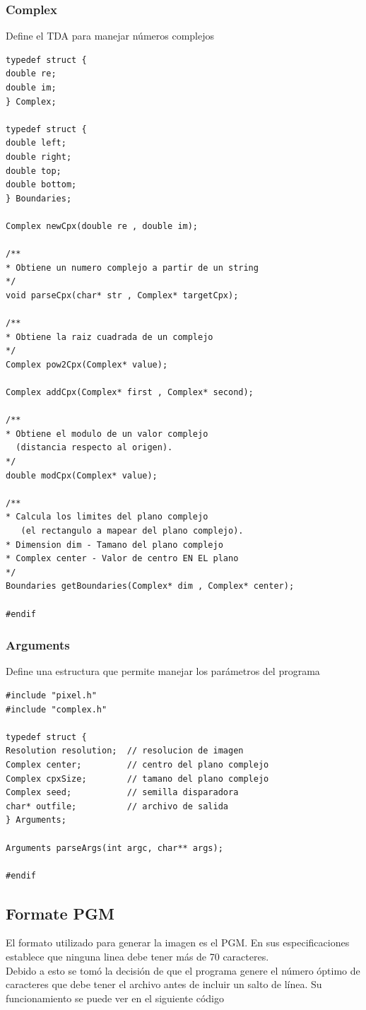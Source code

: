 \documentclass [12pt, a4paper]{article}
\begin{document}
	\subsubsection{\textbf{Complex}}
		Define el TDA para manejar números complejos
	\begin{lstlisting}[frame=single]
typedef struct {
double re;
double im;
} Complex;

typedef struct {
double left;
double right;
double top;
double bottom;
} Boundaries;

Complex newCpx(double re , double im);

/** 
* Obtiene un numero complejo a partir de un string
*/
void parseCpx(char* str , Complex* targetCpx);

/**
* Obtiene la raiz cuadrada de un complejo
*/
Complex pow2Cpx(Complex* value);

Complex addCpx(Complex* first , Complex* second);

/** 
* Obtiene el modulo de un valor complejo 
  (distancia respecto al origen).
*/
double modCpx(Complex* value);

/** 
* Calcula los limites del plano complejo 
   (el rectangulo a mapear del plano complejo).
* Dimension dim - Tamano del plano complejo
* Complex center - Valor de centro EN EL plano
*/
Boundaries getBoundaries(Complex* dim , Complex* center);

#endif

	\end{lstlisting}
	
\subsubsection{\textbf{Arguments}}
Define una estructura que permite manejar los parámetros del programa
\begin{lstlisting}[frame=single]
#include "pixel.h"
#include "complex.h"

typedef struct {
Resolution resolution;  // resolucion de imagen
Complex center;         // centro del plano complejo
Complex cpxSize;        // tamano del plano complejo
Complex seed;           // semilla disparadora
char* outfile;          // archivo de salida
} Arguments;

Arguments parseArgs(int argc, char** args);

#endif

\end{lstlisting}
	
\subsection{Formate PGM}
	El formato utilizado para generar la imagen es el PGM. En sus especificaciones establece que ninguna linea debe tener más de 70 caracteres.\\Debido a esto se tomó la decisión de que el programa genere el número óptimo de caracteres que debe tener el archivo antes de incluir un salto de línea. Su funcionamiento se puede ver en el siguiente código 
	
\end{document}
